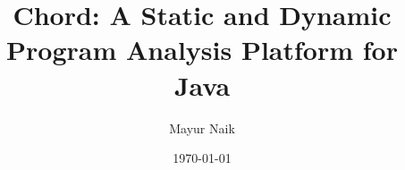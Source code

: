 \documentclass{article}
\title{Chord: A Static and Dynamic Program Analysis Platform for Java}
\author{Mayur Naik}
\date{\today}
\begin{document}
\maketitle


\texonly{\newpage}

\texonly{\newpage}

\texonly{\newpage}

\texonly{\newpage}

\texonly{\newpage}

\texonly{\newpage}

\texonly{\newpage}

\texonly{\newpage}

\texonly{\newpage}

\texonly{\newpage}

\texonly{\newpage}
%
%

\texonly{\newpage}

\texonly{\newpage}

\texonly{\newpage}

\end{document}
